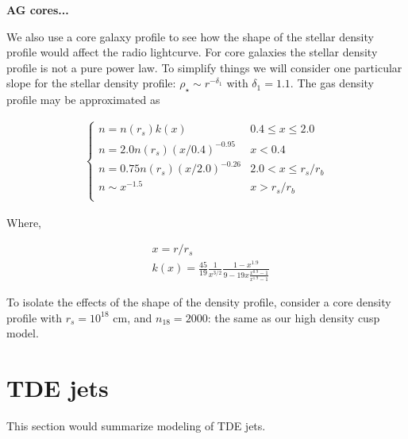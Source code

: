 \documentclass[usenatbib,fleqn]{mnras}
\newcommand{\Mbh}[1][]{M_{\bullet#1}}
\begin{document}
{\bf AG cores...}

We also use a core galaxy profile to see how the shape of the stellar
density profile would affect the radio lightcurve. For core galaxies
the stellar density profile is not a pure power law. To simplify
things we will consider one particular slope for the stellar density
profile: $\rho_\star\sim r^{-\delta_1}$ with $\delta_1=1.1$. The gas
density profile may be approximated as

\begin{align}
\begin{cases}
n=n(r_s) k(x) & 0.4 \leq x\leq 2.0\\
n = 2.0 n(r_s) (x/0.4)^{-0.95} & x < 0.4\\
n = 0.75 n(r_s) (x/2.0)^{-0.26} & 2.0< x \leq r_s/r_b\\
n \sim x^{-1.5} & x>r_s/r_b\\
\end{cases}
\label{eq:cores}
\end{align}

Where, 

\begin{align}
  &x=r/r_s\\\nonumber
  &k(x)=\frac{45}{19} \frac{1}{x^{3/2}} \frac{1-x^{1.9}}{9-19
      x\frac{x^{0.9}-1}{x^{1.9}-1}}
\end{align}

To isolate the effects of the shape of the density profile, consider a
core density profile with $r_s=10^{18}$ cm, and $n_{18}=2000$: the
same as our high density cusp model.



\section{TDE jets}
\label{sec:jet}
This section would summarize modeling of TDE jets.
\end{document}
